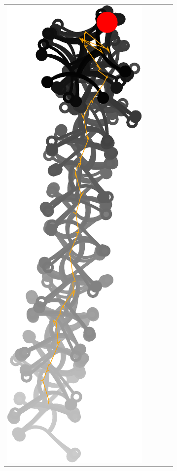 \documentclass[10pt,a4paper]{article}
\begin{document}
\begin{tabular}{ccccc}
\includegraphics[scale=.5]{pics/pathplanner_with_noise/example_straight_04/gait.pdf}
&

\end{tabular}
\end{document}
